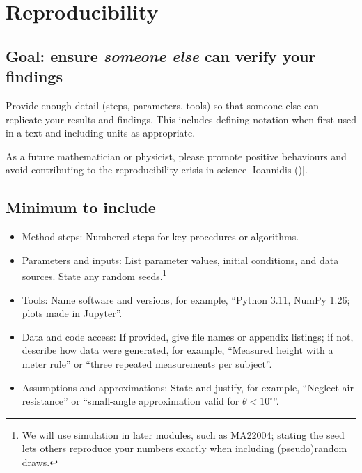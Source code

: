 \documentclass[
  a4paper,
  DIV=11,
  numbers=noendperiod,
  oneside]{scrreprt}
\providecommand{\tightlist}{%
  \setlength{\itemsep}{0pt}\setlength{\parskip}{0pt}}
\begin{document}
\section{Reproducibility}\label{sec-writing-reproducibility}

\subsection{\texorpdfstring{Goal: ensure \emph{someone else} can verify
your
findings}{Goal: ensure someone else can verify your findings}}\label{goal-ensure-someone-else-can-verify-your-findings}

Provide enough detail (steps, parameters, tools) so that someone else
can replicate your results and findings. This includes defining notation
when first used in a text and including units as appropriate.

\begin{tcolorbox}[enhanced jigsaw, opacitybacktitle=0.6, colframe=quarto-callout-important-color-frame, bottomrule=.15mm, coltitle=black, colback=white, title=\textcolor{quarto-callout-important-color}{\faExclamation}\hspace{0.5em}{Reproducibility crisis}, breakable, toptitle=1mm, arc=.35mm, left=2mm, opacityback=0, rightrule=.15mm, bottomtitle=1mm, colbacktitle=quarto-callout-important-color!10!white, toprule=.15mm, leftrule=.75mm, titlerule=0mm]

As a future mathematician or physicist, please promote positive
behaviours and avoid contributing to the reproducibility crisis in
science {[}Ioannidis (){]}.

\end{tcolorbox}

\subsection{Minimum to include}\label{minimum-to-include}

\begin{itemize}
\tightlist
\item
  Method steps: Numbered steps for key procedures or algorithms.
\item
  Parameters and inputs: List parameter values, initial conditions, and
  data sources. State any random seeds.\footnote{We will use simulation
    in later modules, such as MA22004; stating the seed lets others
    reproduce your numbers exactly when including (pseudo)random draws.}
\item
  Tools: Name software and versions, for example, ``Python 3.11, NumPy
  1.26; plots made in Jupyter''.
\item
  Data and code access: If provided, give file names or appendix
  listings; if not, describe how data were generated, for example,
  ``Measured height with a meter rule'' or ``three repeated measurements
  per subject''.
\item
  Assumptions and approximations: State and justify, for example,
  ``Neglect air resistance'' or ``small-angle approximation valid for
  \(\theta<10^\circ\)''.
\end{itemize}
\end{document}
